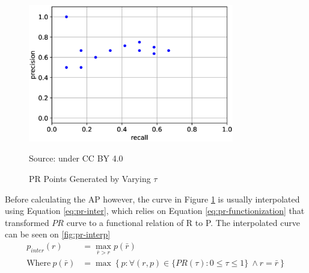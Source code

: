   \begin{figure}[p]
        \centering
        \includegraphics[width=0.8\textwidth]{figures/pr-curve.png}
        \vspace{-1ex}
        \caption*{Source: \textcite{map-hui} under CC BY 4.0}
        \vspace{-1ex}
        \caption{PR Points Generated by Varying $\tau$}
        \label{fig:pr-curve}
  \end{figure}
  Before calculating the AP however, the curve in Figure \ref{fig:pr-curve} is usually interpolated using Equation \ref{eq:pr-inter},
  which relies on Equation \ref{eq:pr-functionization} that transformed $PR$ curve to a functional relation of R to P.
  The interpolated curve can be seen on \ref{fig:pr-interp}
  \begin{align}
    \label{eq:pr-inter}
    p_{inter}(r) &= \max_{\bar{r}>r} p(\bar{r})\\
    \label{eq:pr-functionization}
    \text{Where}~p(\bar{r}) &= \max \left\{p : \forall (r,p) \in \{PR(\tau) : 0\leq\tau\leq 1\}\ \land r=\bar{r}\right\}%
  \end{align}

